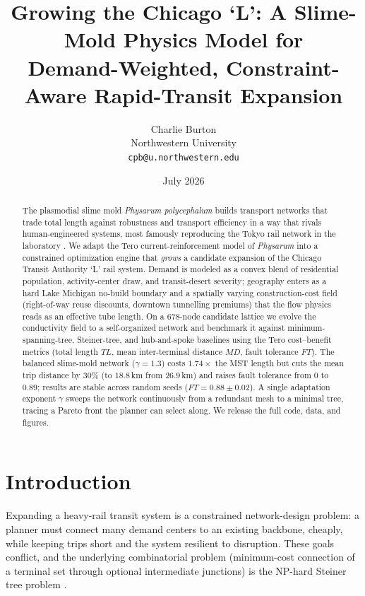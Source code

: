 \documentclass[11pt]{article}
\title{\bfseries Growing the Chicago `L': A Slime-Mold Physics Model for \\
Demand-Weighted, Constraint-Aware Rapid-Transit Expansion}
\author{Charlie Burton\\ \small Northwestern University \\ \small \texttt{cpb@u.northwestern.edu}}
\date{July 2026}
\begin{document}
\maketitle

\begin{abstract}
\noindent The plasmodial slime mold \emph{Physarum polycephalum} builds transport
networks that trade total length against robustness and transport efficiency in a
way that rivals human-engineered systems, most famously reproducing the Tokyo rail
network in the laboratory \citep{tero2010}. We adapt the Tero current-reinforcement
model of \emph{Physarum} into a constrained optimization engine that \emph{grows} a
candidate expansion of the Chicago Transit Authority `L' rail system. Demand is
modeled as a convex blend of residential population, activity-center draw, and
transit-desert severity; geography enters as a hard Lake Michigan no-build boundary
and a spatially varying construction-cost field (right-of-way reuse discounts,
downtown tunnelling premiums) that the flow physics reads as an effective tube
length. On a $678$-node candidate lattice we evolve the conductivity field to a
self-organized network and benchmark it against minimum-spanning-tree, Steiner-tree,
and hub-and-spoke baselines using the Tero cost--benefit metrics (total length $TL$,
mean inter-terminal distance $MD$, fault tolerance $FT$). The balanced slime-mold
network ($\gamma=1.3$) costs $1.74\times$ the MST length but cuts the mean trip
distance by $30\%$ (to $18.8$\,km from $26.9$\,km) and raises fault tolerance from
$0$ to $0.89$; results are stable across random seeds ($FT=0.88\pm0.02$). A single
adaptation exponent $\gamma$ sweeps the network continuously from a redundant mesh
to a minimal tree, tracing a Pareto front the planner can select along. We release
the full code, data, and figures.
\end{abstract}

\section{Introduction}
Expanding a heavy-rail transit system is a constrained network-design problem: a
planner must connect many demand centers to an existing backbone, cheaply, while
keeping trips short and the system resilient to disruption. These goals conflict,
and the underlying combinatorial problem (minimum-cost connection of a terminal set
through optional intermediate junctions) is the NP-hard Steiner tree problem
\citep{hwang1992}.
\end{document}
